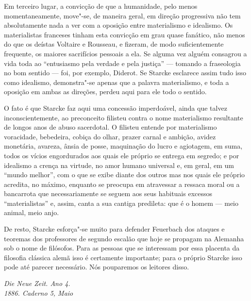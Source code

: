 Em terceiro lugar, a convicção de que a humanidade, pelo menos
momentaneamente, move"-se, de maneira geral, em direção progressiva não %
tem absolutamente nada a ver com a oposição entre materialismo e
idealismo. Os materialistas franceses tinham esta convicção em grau
quase fanático, não menos do que os
deístas Voltaire e Rousseau,
e fizeram, de modo suficientemente frequente, os maiores sacrifícios %
pessoais a ela. Se alguma vez alguém consagrou a vida toda ao
``entusiasmo pela verdade e pela justiça'' --- tomando a fraseologia no
bom sentido --- foi, por
exemplo, Diderot. Se Starcke esclarece %
assim tudo isso como idealismo, demonstra"-se apenas que a palavra %
materialismo, e toda a oposição em ambas as direções, perdeu aqui para ele %
todo o sentido.

O fato é que Starcke faz aqui uma concessão imperdoável, ainda que %
talvez inconscientemente, ao preconceito filisteu contra o nome
materialismo resultante de longos anos de abuso sacerdotal. O filisteu
entende por materialismo voracidade, bebedeira, cobiça do olhar, prazer
carnal e ambição, avidez monetária, avareza, ânsia de posse, maquinação
do lucro e agiotagem, em suma, todos os vícios engordurados aos quais
ele próprio se entrega em segredo; e por idealismo a crença na virtude,
no amor humano universal e, em geral, em um ``mundo melhor'', com o que
se exibe diante dos outros mas nos quais ele próprio acredita, no
máximo, enquanto se preocupa em atravessar a ressaca moral 
ou a bancarrota que necessariamente se seguem aos
seus habituais excessos ``materialistas'' e, assim, canta a sua cantiga
predileta: que é o homem --- meio animal, meio anjo. %

De resto, Starcke esforça"-se muito para
defender Feuerbach dos
ataques e teoremas dos professores de segundo escalão
que hoje se propagam na Alemanha sob o nome de filósofos. Para as pessoas
que se interessam por essa placenta da filosofia clássica alemã isso é
certamente importante; para o próprio Starcke isso pode até
parecer necessário. Nós pouparemos os leitores disso.

\quebra

\begin{flushright}
\emph{Die Neue Zeit. Ano 4.}\\
\emph{1886. Caderno 5, Maio}
\end{flushright}

